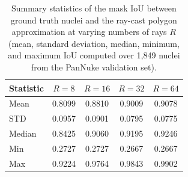 \begin{table}[H]
	\centering
	\caption{Summary statistics of the mask IoU between ground truth nuclei and the ray-cast polygon approximation at varying numbers of rays $R$ (mean, standard deviation, median, minimum, and maximum IoU computed over 1{,}849 nuclei from the PanNuke validation set).}
	\label{tab:raycast-iou}
	\begin{tabular*}{\textwidth}{@{\extracolsep{\fill}}lcccc}
		\hline
		\textbf{Statistic} & \textbf{$R = 8$} & \textbf{$R = 16$} & \textbf{$R = 32$} & \textbf{$R = 64$} \\
		\hline
		Mean   & 0.8099 & 0.8810 & 0.9009 & 0.9078 \\
		STD    & 0.0957 & 0.0901 & 0.0795 & 0.0775 \\
		Median & 0.8425 & 0.9060 & 0.9195 & 0.9246 \\
		Min    & 0.2727 & 0.2727 & 0.2667 & 0.2667 \\
		Max    & 0.9224 & 0.9764 & 0.9843 & 0.9902 \\
		\hline
	\end{tabular*}
\end{table}
